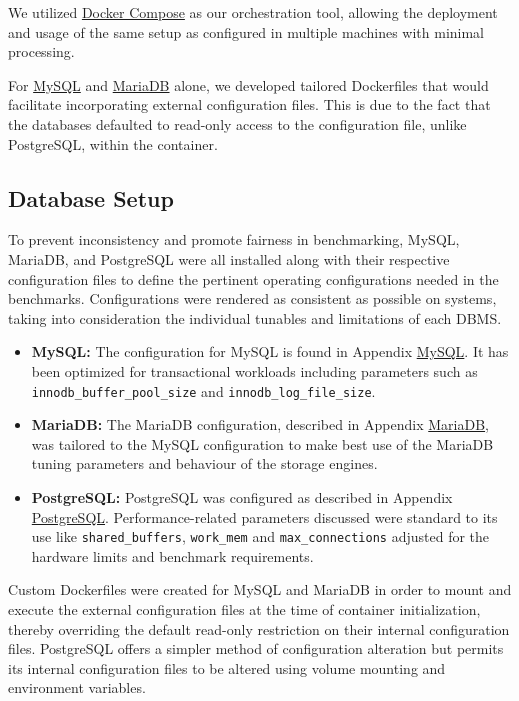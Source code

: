 We utilized \hyperref[sec:docker-compose]{Docker Compose} as our orchestration tool, allowing the deployment and usage of the same setup as configured in multiple machines with minimal processing. 

For \hyperref[sec:dockerfile-mysql]{MySQL} and \hyperref[sec:dockerfile-mariadb]{MariaDB} alone, we developed tailored Dockerfiles that would facilitate incorporating external configuration files. This is due to the fact that the databases defaulted to read-only access to the configuration file, unlike PostgreSQL, within the container.

\subsection{Database Setup}
\label{sec:database-setup}

To prevent inconsistency and promote fairness in benchmarking, MySQL, MariaDB, and PostgreSQL were all installed along with their respective configuration files to define the pertinent operating configurations needed in the benchmarks. Configurations were rendered as consistent as possible on systems, taking into consideration the individual tunables and limitations of each DBMS.

\begin{itemize}
    \setlength\itemsep{0.1em}
    \item \textbf{MySQL:} The configuration for MySQL is found in Appendix \hyperref[sec:mysql-config]{MySQL}. It has been optimized for transactional workloads including parameters such as \texttt{innodb\_buffer\_pool\_size} and \texttt{innodb\_log\_file\_size}.
    \item \textbf{MariaDB:} The MariaDB configuration, described in Appendix \hyperref[sec:mariadb-config]{MariaDB}, was tailored to the MySQL configuration to make best use of the MariaDB tuning parameters and behaviour of the storage engines.
    \item \textbf{PostgreSQL:} PostgreSQL was configured as described in Appendix \hyperref[sec:postgresql-config]{PostgreSQL}. Performance-related parameters discussed were standard to its use like \texttt{shared\_buffers}, \texttt{work\_mem} and \texttt{max\_connections} adjusted for the hardware limits and benchmark requirements.
\end{itemize}

Custom Dockerfiles were created for MySQL and MariaDB in order to mount and execute the external configuration files at the time of container initialization, thereby overriding the default read-only restriction on their internal configuration files. PostgreSQL offers a simpler method of configuration alteration but permits its internal configuration files to be altered using volume mounting and environment variables. 

